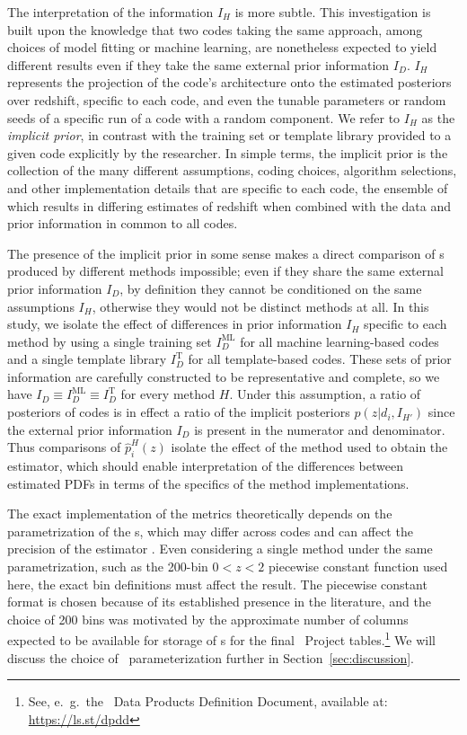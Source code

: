 The interpretation of the information $I_{H}$ is more subtle.
This investigation is built upon the knowledge that two codes taking the same approach, among choices of model fitting or machine learning, are nonetheless expected to yield different results even if they take the same external prior information $I_{D}$.
$I_{H}$ represents the projection of the code's architecture onto the estimated posteriors over redshift, specific to each code, and even the tunable parameters or random seeds of a specific run of a code with a random component.
We refer to $I_{H}$ as the \textit{implicit prior}, in contrast with the training set or template library provided to a given code explicitly by the researcher.  In simple terms, the implicit prior is the collection of the many different assumptions, coding choices, algorithm selections, and other implementation details that are specific to each code, the ensemble of which results in differing estimates of redshift when combined with the data and prior information in common to all codes.

The presence of the implicit prior in some sense makes a direct comparison of \pzpdf s produced by different methods impossible; even if they share the same external prior information $I_{D}$, by definition they cannot be conditioned on the same assumptions $I_{H}$, otherwise they would not be distinct methods at all.
In this study, we isolate the effect of differences in prior information $I_{H}$ specific to each method by using a single training set $I_{D}^{\mathrm{ML}}$ for all machine learning-based codes and a single template library $I_{D}^{\mathrm{T}}$ for all template-based codes.
These sets of prior information are carefully constructed to be representative and complete, so we have $I_{D} \equiv I_{D}^{\mathrm{ML}} \equiv I_{D}^{\mathrm{T}}$ for every method $H$.
Under this assumption, a ratio of posteriors of codes is in effect a ratio of the implicit posteriors $p(z \vert d_{i}, I_{H'})$ since the external prior information $I_{D}$ is present in the numerator and denominator.
Thus comparisons of $\hat{p}_{i}^{H}(z)$ isolate the effect of the method used to obtain the estimator, which should enable interpretation of the differences between estimated PDFs in terms of the specifics of the method implementations.

The exact implementation of the metrics theoretically depends on the parametrization of the \pzpdf s, which may differ across codes and can affect the precision of the estimator \citep{Malz:2018}.
Even considering a single method under the same parametrization, such as the 200-bin $0 < z < 2$ piecewise constant function used here, the exact bin definitions must affect the result.
The piecewise constant format is chosen because of its established presence in the literature, and the choice of 200 bins was motivated by the approximate number of columns expected to be available for storage of \pzpdf s for the final \lsst\ Project tables.\footnote{See, e.~g.~the \lsst\ Data Products Definition Document, available at: \url{https://ls.st/dpdd}}
We will discuss the choice of \pzpdf\ parameterization further in Section~\ref{sec:discussion}.

